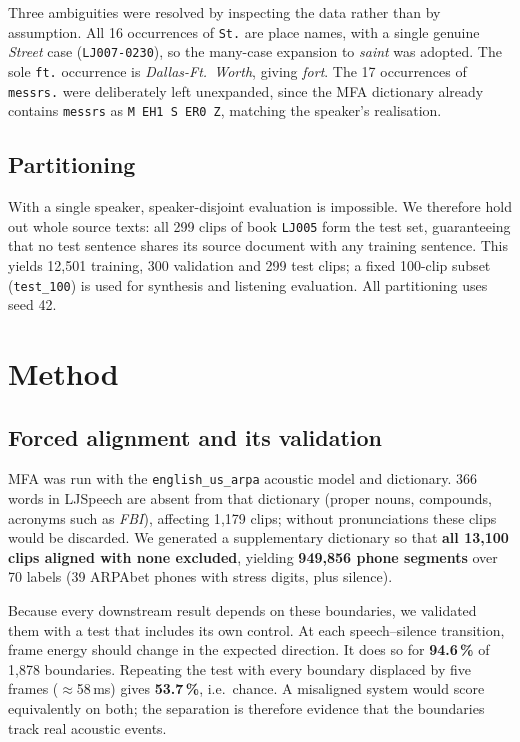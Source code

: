 \documentclass[conference]{IEEEtran}
\begin{document}
Three ambiguities were resolved by inspecting the data rather than by assumption. All 16
occurrences of \texttt{St.} are place names, with a single genuine \emph{Street} case
(\texttt{LJ007-0230}), so the many-case expansion to \emph{saint} was adopted. The sole
\texttt{ft.} occurrence is \emph{Dallas-Ft.\ Worth}, giving \emph{fort}. The 17 occurrences of
\texttt{messrs.} were deliberately left unexpanded, since the MFA dictionary already contains
\texttt{messrs} as \texttt{M EH1 S ER0 Z}, matching the speaker's realisation.

\subsection{Partitioning}
With a single speaker, speaker-disjoint evaluation is impossible. We therefore hold out whole
source texts: all 299 clips of book \texttt{LJ005} form the test set, guaranteeing that no test
sentence shares its source document with any training sentence. This yields 12{,}501 training,
300 validation and 299 test clips; a fixed 100-clip subset (\texttt{test\_100}) is used for
synthesis and listening evaluation. All partitioning uses seed 42.

\section{Method}

\subsection{Forced alignment and its validation}
\label{sec:align}
MFA was run with the \texttt{english\_us\_arpa} acoustic model and dictionary. 366 words in
LJSpeech are absent from that dictionary (proper nouns, compounds, acronyms such as \emph{FBI}),
affecting 1{,}179 clips; without pronunciations these clips would be discarded. We generated a
supplementary dictionary so that \textbf{all 13{,}100 clips aligned with none excluded}, yielding
\textbf{949{,}856 phone segments} over 70 labels (39 ARPAbet phones with stress digits, plus
silence).

Because every downstream result depends on these boundaries, we validated them with a test that
includes its own control. At each speech--silence transition, frame energy should change in the
expected direction. It does so for \textbf{94.6\,\%} of 1{,}878 boundaries. Repeating the test
with every boundary displaced by five frames ($\approx$58\,ms) gives \textbf{53.7\,\%}, i.e.\
chance. A misaligned system would score equivalently on both; the separation is therefore evidence
that the boundaries track real acoustic events.
\end{document}
